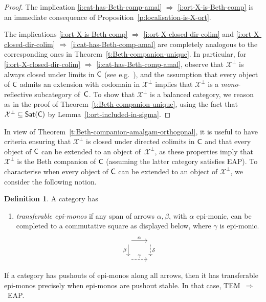 \documentclass[a4paper,10pt,reqno]{amsart}
\theoremstyle{definition}
\newtheorem{definition}[theorem]{Definition}
\theoremstyle{remark}
\newcommand{\cat}{{\sf C}}								%
\newcommand{\Sat}{{\sf Sat}}								%
\newcommand{\ar}[1]{\mathcal{#1}}							%
\newcommand{\X}{\ar{X}}									%
\newcommand{\ort}[1]{{#1}^{\perp}}						%
\newcommand{\IMP}{\Rightarrow}						%
\newcommand{\EAP}{\textnormal{EAP}}
\newcommand{\TEM}{\textnormal{TEM}}
\begin{document}
\begin{proof}
The implication \ref{i:cat-has-Beth-comp-amal} $\IMP$ \ref{i:ort-X-is-Beth-comp} is an immediate consequence of Proposition~\ref{p:localisation-is-X-ort}.

The implications \ref{i:ort-X-is-Beth-comp} $\IMP$ \ref{i:ort-X-closed-dir-colim} and \ref{i:ort-X-closed-dir-colim}  $\IMP$ \ref{i:cat-has-Beth-comp-amal} are completely analogous to the corresponding ones in Theorem~\ref{t:Beth-companion-unique}. In particular, for \ref{i:ort-X-closed-dir-colim}  $\IMP$ \ref{i:cat-has-Beth-comp-amal}, observe that $\ort{\X}$ is always closed under limits in $\cat$ (see e.g.\ \cite[Observation~1.34]{ar94book}), and the assumption that every object of $\cat$ admits an extension with codomain in $\ort{\X}$ implies that $\ort{\X}$ is a \emph{mono}-reflective subcategory of~$\cat$. To show that $\ort{\X}$ is a balanced category, we reason as in the proof of Theorem~\ref{t:Beth-companion-unique}, using the fact that $\ort{\X}\subseteq \Sat(\cat)$ by Lemma~\ref{l:ort-included-in-sigma}.
\end{proof}

In view of Theorem~\ref{t:Beth-companion-amalgam-orthogonal}, it is useful to have criteria ensuring that $\ort{\X}$ is closed under directed colimits in $\cat$ and that every object of $\cat$ can be extended to an object of~$\ort{\X}$, as these properties imply that $\ort{\X}$ is the Beth companion of $\cat$ (assuming the latter category satisfies \EAP).
%
To characterise when every object of $\cat$ can be extended to an object of $\ort{\X}$, we consider the following notion.

\begin{definition}\label{d:TEM}
A category has 
\begin{enumerate}
\item[(TEM)]\label{TEM} \emph{transferable epi-monos} if any span of arrows $\alpha,\beta$, with $\alpha$ epi-monic, can be completed to a commutative square as displayed below, where $\gamma$ is epi-monic.
\[\begin{tikzcd}[cells={nodes={inner sep=2pt, outer sep=1pt}}]
\phantom{\cdot} \arrow{r}{\alpha} \arrow{d}[swap]{\beta} & \phantom{\cdot} \arrow[dashed]{d}{\delta} \\
\phantom{\cdot} \arrow[dashed]{r}[rightarrowtail]{\gamma} & \phantom{\cdot}
\end{tikzcd}\]
\end{enumerate}
\end{definition}
%
If a category has pushouts of epi-monos along all arrows, then it has transferable epi-monos precisely when epi-monos are pushout stable. In that case, \TEM~$\IMP$~\EAP.
\end{document}
